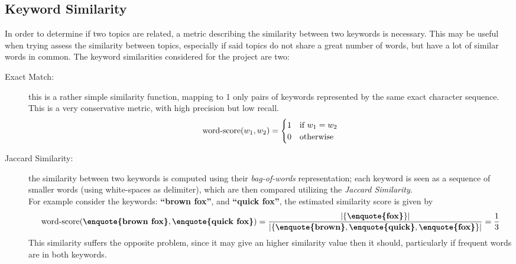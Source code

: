 \subsection{Keyword Similarity}\label{sec:keyword_similarity}
In order to determine if two topics are related, a metric describing the similarity between two keywords is necessary. This may be useful when trying assess the similarity between topics, especially if said topics do not share a great number of words, but have a lot of similar words in common. The keyword similarities considered for the project are two:
\begin{description}
	\item[Exact Match:] this is a rather simple similarity function, mapping to 1 only pairs of keywords represented by the same exact character sequence. This is a very conservative metric, with high precision but low recall.
	$$
	\mathop{\mathrm{word\text{-}score}}(w_1,w_2) = \begin{cases}
	1 & \text{if $w_1 = w_2$}\\
	0 & \text{otherwise}
	\end{cases}
	$$
	\item[Jaccard Similarity:] the similarity between two keywords  is computed  using their \textit{bag-of-words} representation; each keyword is seen as a sequence of smaller words (using white-spaces as delimiter), which are then compared utilizing the \textit{Jaccard Similarity}.\\
	For example consider the keywords: \textbf{\enquote{brown fox}}, and \textbf{\enquote{quick fox}}, the estimated similarity score is given by 
	$$
	\KeywordScore(\textbf{\enquote{brown fox}}, \textbf{\enquote{quick fox}})  = %
	\frac{|\{\textbf{\enquote{fox}}\}|}{|\{\textbf{\enquote{brown}}, \textbf{\enquote{quick}}, \textbf{\enquote{fox}}\}|}= \frac{1}{3}
	$$
	This similarity suffers the opposite problem, since it may give an higher similarity value then it  should, particularly if frequent words are in both keywords.
\end{description}
